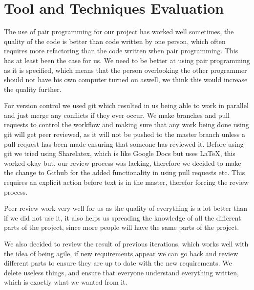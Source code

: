 \section{Tool and Techniques Evaluation}

The use of pair programming for our project has worked well sometimes, the quality of the code is better than code written by one person, which often requires more refactoring than the code written when pair programming.
This has at least been the case for us. 
We need to be better at using pair programming as it is specified, which means that the person overlooking the other programmer should not have his own computer turned on aswell, we think this would increase the quality further. 

For version control we used git which resulted in us being able to work in parallel and just merge any conflicts if they ever occur.
We make branches and pull requests to control the workflow and making sure that any work being done using git will get peer reviewed, as it will not be pushed to the master branch unless a pull request has been made ensuring that someone has reviewed it.
Before using git we tried using Sharelatex, which is like Google Docs but uses \LaTeX, this worked okay but, our review process was lacking, therefore we decided to make the change to Github for the added functionality in using pull requests etc. 
This requires an explicit action before text is in the master, therefor forcing the review process. 

Peer review work very well for us as the quality of everything is a lot better than if we did not use it, it also helps us spreading the knowledge of all the different parts of the project, since more people will have the same parts of the project.

We also decided to review the result of previous iterations, which works well with the idea of being agile, if new requirements appear we can go back and review different parts to ensure they are up to date with the new requirements.
We delete useless things, and ensure that everyone understand everything written, which is exactly what we wanted from it.